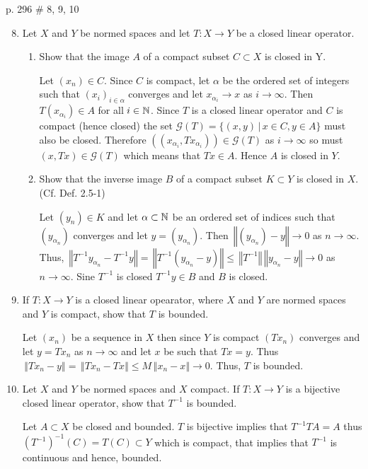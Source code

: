 \documentclass[10pt,a4paper]{report}
\newcommand{\NORM}[1]{\,\left \Vert #1 \right \Vert}
\begin{document}
\newpage p. 296 \# 8, 9, 10 
\begin{enumerate}
	\setcounter{enumi}{7}
	\item Let $X$ and $Y$ be normed spaces and let $T: X \to Y$ be a closed linear operator.  
	\begin{enumerate}
		\item Show that the image $A$ of a compact subset $C \subset X$ is closed in Y.

		Let $(x_n) \in C$.  Since $C$ is compact, let $\alpha$ be the ordered set of integers such that $(x_i)_{i\in \alpha}$ converges and let $x_{\alpha_i} \to x$ as $i \to \infty$.  Then $T(x_{\alpha_i}) \in A$ for all $i \in \mathbb{N}$.  Since $T$ is a closed linear operator and $C$ is compact (hence closed) the set $\mathcal{G}(T)=\{ (x,y) \,|\, x \in C, y \in A\}$ must also be closed.  Therefore $((x_{\alpha_i}, Tx_{\alpha_i}))\in\mathcal{G}(T)$ as $i \to \infty$ so must $(x, Tx) \in \mathcal{G}(T)$ which means that $Tx \in A$.  Hence $A$ is closed in $Y$. 
		
		\item Show that the inverse image $B$ of a compact subset $K \subset Y$ is closed in $X$.  (Cf. Def. 2.5-1)
		
		Let $(y_n) \in K$ and let $\alpha\subset \mathbb{N}$ be an ordered set of indices such that $(y_{\alpha_n})$ converges and let $y = (y_{\alpha_n})$. Then $\NORM{(y_{\alpha_n}) - y} \to 0$ as $n \to \infty$.  Thus, $\NORM{T^{-1}y_{\alpha_n} - T^{-1}y} = \NORM{T^{-1}(y_{\alpha_n} - y)} \le \NORM{T^{-1}}\NORM{y_{\alpha_n}-y} \to 0$ as $n \to \infty$.  Sine $T^{-1}$ is closed $T^{-1}y \in B$ and $B$ is closed.
		
	\end{enumerate}
	
	\item If $T: X \to Y$ is a closed linear opearator, where $X$ and $Y$ are normed spaces and $Y$ is compact, show that $T$ is bounded.
	
	Let $(x_n)$ be a sequence in $X$ then since $Y$ is compact $(Tx_n)$ converges and let $y = Tx_n$ as $n \to \infty$ and let $x$ be such that $Tx=y$. Thus $\NORM{Tx_n - y} = \NORM{Tx_n -Tx} \le M\NORM{x_n-x} \to 0$.  Thus, $T$ is bounded.
	
	\item Let $X$ and $Y$ be normed spaces and $X$ compact.  If $T: X \to Y$ is a bijective closed linear operator, show that $T^{-1}$ is bounded.
	
	Let $A \subset X$ be closed and bounded.  $T$ is bijective implies that $T^{-1}TA = A$  thus $(T^{-1})^{-1}(C) = T(C) \subset Y$ which is compact, that implies that $T^{-1}$ is continuous and hence, bounded.

\end{enumerate}
\end{document}
